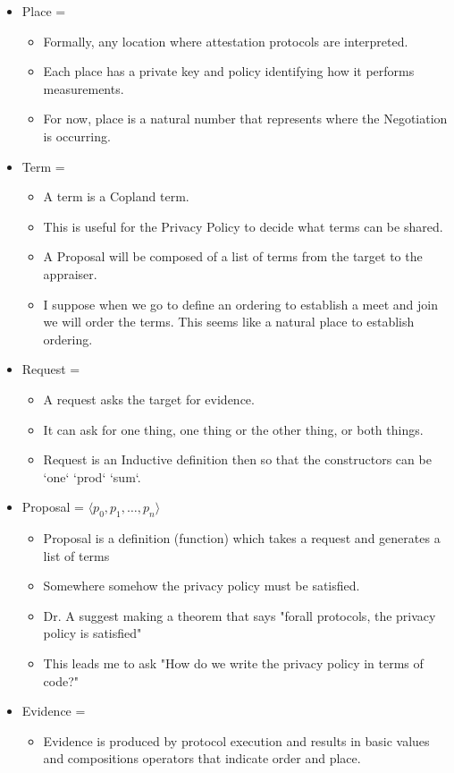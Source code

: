 \documentclass[10pt]{report}
\newcommand{\squash}{\itemsep=0pt\parskip=0pt}
\newcommand{\terms}[0]{\cnc{\emph{t}} }
\newcommand{\req}[0]{\cnc{\emph{R}}}
\newcommand{\vals}[0]{\cnc{\emph{e}}}}
\newcommand{\proposal}[0]{$\langle p_0,p_1,\ldots,p_n\rangle$}
\begin{document}
\begin{itemize}
\item Place = \pl
	\begin{itemize}
	\squash
	\item Formally, any location where attestation protocols are interpreted. 
	\item Each place has a private key and policy
		  identifying how it performs measurements. 
	\item For now, place is a natural number that represents where the
          Negotiation is occurring.  
	\end{itemize}
\item Term = \terms
	\begin{itemize}
	\squash
	\item A term is a Copland term. 
	\item This is useful for the Privacy Policy to decide what terms can
          be shared. 
	\item A Proposal will be composed of a list of terms from the target
          to the appraiser.
	\item I suppose when we go to define an ordering to establish a meet
          and join we will order the terms. This seems like a natural place
          to establish ordering. 
	\end{itemize}
\item Request = \req
	\begin{itemize}
	\squash
	\item A request asks the target for evidence. 
	\item It can ask for one thing, one thing or the other thing, or
          both things. 
	\item Request is an Inductive definition then so that the constructors
          can be `one` `prod` `sum`.
	\end{itemize}
\item Proposal = \proposal
	\begin{itemize}
	\squash
	\item Proposal is a definition (function) which takes a request
          and generates a list of terms
	\item Somewhere somehow the privacy policy must be satisfied. 
	\item Dr. A suggest making a theorem that says "forall protocols,
          the privacy policy is satisfied"
	\item This leads me to ask "How do we write the privacy policy in
          terms of code?"
	\end{itemize}
\item Evidence = \vals
	\squash
	\begin{itemize}
	\item Evidence is produced by protocol execution and results in 
          basic values and compositions operators that indicate order 
	      and place.
	\end{itemize} 
\end{itemize}
\end{document}
